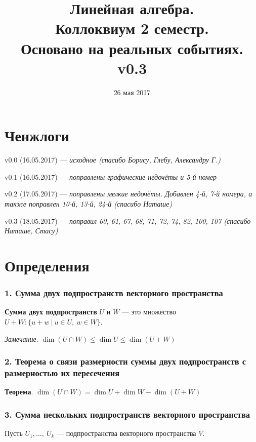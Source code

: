 \documentclass[a4paper, 12pt]{article}
\begin{document}
\title{Линейная алгебра.\\ Коллоквиум 2 семестр.\\ Основано на реальных событиях.\\ v0.3}
\date{26 мая 2017}

\maketitle

\part*{Ченжлоги}
v0.0 (16.05.2017) --- \textit{исходное (спасибо Борису, Глебу, Александру Г.)}

v0.1 (16.05.2017) --- \textit{поправлены графические недочёты и 5-й номер}

v0.2 (17.05.2017) --- \textit{поправлены мелкие недочёты. Добавлен 4-й, 7-й номера, а также поправлен 10-й, 13-й, 24-й (спасибо Наташе)}

v0.3 (18.05.2017) --- \textit{поправил 60, 61, 67, 68, 71, 72, 74, 82, 100, 107 (спасибо Наташе, Стасу)}

\part*{Определения}

\section*{1. Сумма двух подпространств векторного пространства}
\textbf{Сумма двух подпространств} $U$ и $W$ --- это множество $U + W: \{u + w\ |\ u \in U,\ w \in W \}$.

\textit{Замечание}. $\dim(U \cap W) \leqslant \dim U \leqslant \dim(U + W)$

\section*{2. Теорема о связи размерности суммы двух подпространств с размерностью их пересечения}
\textbf{Теорема}. $\dim(U \cap W) = \dim U + \dim W - \dim(U + W)$

\section*{3. Сумма нескольких подпространств векторного пространства}
Пусть $U_1, \ldots,\ U_k$ --- подпространства векторного пространства $V$.
\end{document}
